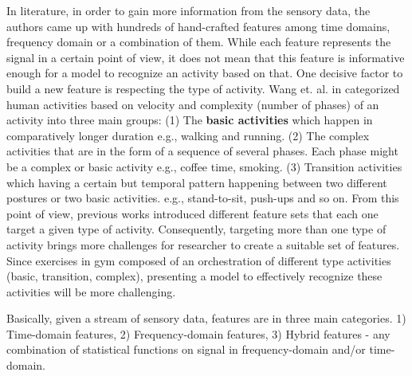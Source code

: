 \documentclass[journal,article,submit,moreauthors,pdftex]{Definitions/mdpi}
\begin{document}
In literature, in order to gain more information from the sensory data, the authors came up with hundreds of hand-crafted features among time domains, frequency domain or a combination of them. While each feature represents the signal in a certain point of view, it does not mean that this feature is informative enough for a model to recognize an activity based on that. One decisive factor to build a new feature is respecting the type of activity. Wang et. al. in \cite{wang2019survey} categorized human activities based on velocity and complexity (number of phases) of an activity into three main groups: (1) The \textbf{basic activities} which happen in comparatively longer duration e.g., walking and running. (2)  The complex activities that are in the form of a sequence of several phases. Each phase might be a complex or basic activity e.g., coffee time, smoking. (3) Transition activities which having a certain but temporal pattern happening between two different postures or two basic activities. e.g., stand-to-sit, push-ups and so on. From this point of view, previous works introduced  different feature sets that each one target a given type of activity. Consequently, targeting more than one type of activity brings more challenges for researcher to create a suitable set of features. Since exercises in gym composed of an orchestration of different type activities (basic, transition, complex), presenting a model to effectively recognize these activities will be more challenging.

Basically, given a stream of sensory data, features are in three main categories.\cite{wang2019survey} 1) Time-domain features, 2) Frequency-domain features, 3) Hybrid features - any combination of statistical functions on signal in frequency-domain and/or time-domain. 

\end{document}
